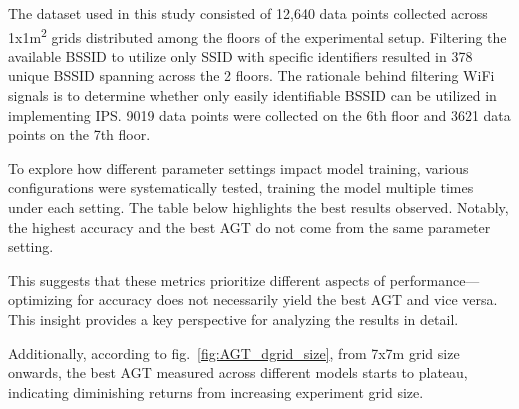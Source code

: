 \documentclass[runningheads]{llncs}
\begin{document}
The dataset used in this study consisted of 12,640 data points collected across 1x1m\textsuperscript{2} grids distributed among the floors of the experimental setup. Filtering the available BSSID to utilize only SSID with specific identifiers resulted in 378 unique BSSID spanning across the 2 floors. The rationale behind filtering WiFi signals is to determine whether only easily identifiable BSSID can be utilized in implementing IPS. 9019 data points were collected on the 6th floor and 3621 data points on the 7th floor.

To explore how different parameter settings impact model training, various configurations were systematically tested, training the model multiple times under each setting. The table below highlights the best results observed. Notably, the highest accuracy and the best AGT do not come from the same parameter setting.



This suggests that these metrics prioritize different aspects of performance—optimizing for accuracy does not necessarily yield the best AGT and vice versa. This insight provides a key perspective for analyzing the results in detail. 

Additionally, according to fig.~\ref{fig:AGT_dgrid_size}, from 7x7m grid size onwards, the best AGT measured across different models starts to plateau, indicating diminishing returns from increasing experiment grid size.
\end{document}
